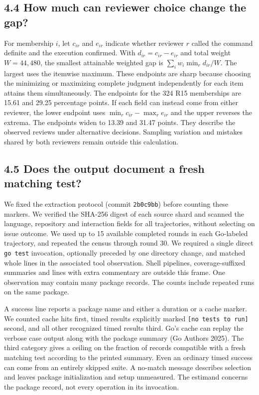 \documentclass[10pt,a4paper]{article}
\begin{document}
\subsection{4.4 How much can reviewer choice change the gap?}
For membership $i$, let $c_{ir}$ and $e_{ir}$ indicate whether reviewer $r$ called the command definite and the execution confirmed. With $d_{ir}=c_{ir}-e_{ir}$ and total weight $W=44{,}480$, the smallest attainable weighted gap is $\sum_i w_i\min_r d_{ir}/W$. The largest uses the itemwise maximum. These endpoints are sharp because choosing the minimizing or maximizing complete judgment independently for each item attains them simultaneously. The endpoints for the 324 R15 memberships are 15.61 and 29.25 percentage points. If each field can instead come from either reviewer, the lower endpoint uses $\min_r c_{ir}-\max_r e_{ir}$ and the upper reverses the extrema. The endpoints widen to 13.39 and 31.47 points. They describe the observed reviews under alternative decisions. Sampling variation and mistakes shared by both reviewers remain outside this calculation.

\subsection{4.5 Does the output document a fresh matching test?}
We fixed the extraction protocol (commit \texttt{2b0c9bb}) before counting these markers. We verified the SHA-256 digest of each source shard and scanned the language, repository and interaction fields for all trajectories, without selecting on issue outcome. We used up to 15 available completed rounds in each Go-labeled trajectory, and repeated the census through round 30. We required a single direct \texttt{go test} invocation, optionally preceded by one directory change, and matched whole lines in the associated tool observation. Shell pipelines, coverage-suffixed summaries and lines with extra commentary are outside this frame. One observation may contain many package records. The counts include repeated runs on the same package.

A success line reports a package name and either a duration or a cache marker. We counted cache hits first, timed results explicitly marked \texttt{[no tests to run]} second, and all other recognized timed results third. Go's cache can replay the verbose case output along with the package summary (Go Authors 2025). The third category gives a ceiling on the fraction of records compatible with a fresh matching test according to the printed summary. Even an ordinary timed success can come from an entirely skipped suite. A no-match message describes selection and leaves package initialization and setup unmeasured. The estimand concerns the package record, not every operation in its invocation.
\end{document}

